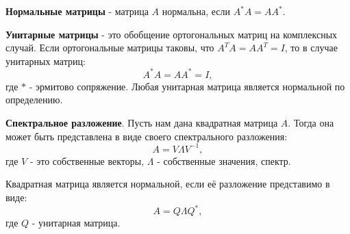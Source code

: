 \textbf{Нормальные матрицы} - матрица \(A\) нормальна, если \(A^*A=AA^*\).

\textbf{Унитарные матрицы} - это обобщение ортогональных матриц на комплексных случай. Если ортогональные матрицы таковы, что \(A^TA=AA^T=I\), то в случае унитарных матриц:
\[A^*A=AA^*=I,\]
где \(*\) - эрмитово сопряжение. Любая унитарная матрица является нормальной по определению.

\textbf{Спектральное разложение}. Пусть нам дана квадратная матрица \(A\). Тогда она может быть представлена в виде своего спектрального разложения:
\[ A=V\Lambda V^{-1},\]
 где \(V\) - это собственные векторы, \(\Lambda\) - собственные значения, спектр.

Квадратная матрица является нормальной, если её разложение представимо в виде:
\[A=Q \Lambda Q^*,\]
где \(Q\) - унитарная матрица. 

